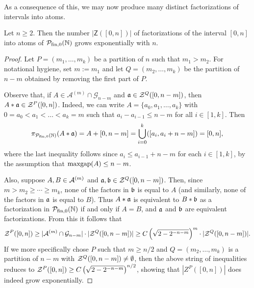 As a consequence of this, we may now produce many distinct factorizations of intervals into atoms.

\begin{prop}
Let $n\ge 2$.
Then the number $|\mathsf{Z}([0,n])|$ of factorizations of the interval $[0,n]$ into atoms of $\PN$ grows exponentially with $n$.
\end{prop}

\begin{proof}
Let $P = (m_1,\dots, m_k)$ be a partition of $n$ such that $m_1 > m_2$.
For notational hygiene, set $m:= m_1$ and let $Q = (m_2,\dots, m_k)$ be the partition of $n-m$ obtained by removing the first part of $P$.

Observe that, if $A\in \mathcal{A}^{(m)}\cap \mathcal{G}_{n-m}$ and $\aa\in \Z^Q([0,n-m])$, then $A*\aa\in \Z^P([0,n])$.
Indeed, we can write $A = \{a_0,a_1,\dots, a_k\}$ with $0 =a_0 < a_1 <\dots < a_k = m$ such that $a_i - a_{i-1} \le n-m$ for all $i\in[1,k]$.
Then 
\[\pi_\PN(A*\aa) = A + [0,n-m] = \bigcup_{i=0}^k ([a_i,a_i+n-m]) = [0,n], \]
where the last inequality follows since $a_i \le a_{i-1} + n-m$ for each $i\in [1,k]$, by the assumption that $\maxgap(A) \le n-m$.

Also, suppose $A,B\in \A^{(m)}$ and $\aa,\bb\in \Z^Q([0,n-m])$.
Then, since $m > m_2 \ge \cdots \ge m_k$, none of the factors in $\bb$ is equal to $A$ (and similarly, none of the factors in $\aa$ is equal to $B$).
Thus $A*\aa$ is equivalent to $B*\bb$ as a factorization in $\PN$ if and only if $A=B$, and $\aa$ and $\bb$ are equivalent factorizations. 
From this it follows that
\[ \Z^{P}([0,n]) \ge |\A^{(m)}\cap \mathcal{G}_{n-m}| \cdot |\Z^Q([0,n-m])| \ge C\left(\sqrt{2-2^{-n-m}}\right)^m \cdot |\Z^Q([0,n-m])|.\]
If we more specifically chose $P$ such that $m\ge n/2$ and $Q = (m_2,\dots,m_k)$ is a partition of $n-m$ with $\Z^Q([0,n-m])\neq \emptyset$, then the above string of inequalities reduces to $\Z^{P}([0,n])\ge C\left(\sqrt{2-2^{-n-m}}\right)^{n/2}$, showing that $|Z^{P}([0,n])|$ does indeed grow exponentially.
\end{proof}